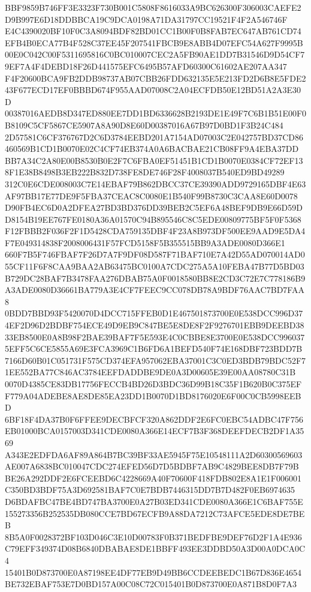 \documentclass[UTF8,fontset=fandol,zihao=-4,a4paper]{ctexart}
\begin{document}
{{BBF9859B746FF3E3323F730B001C5808F8616033A9BC626300F306003CAEFE2D9B997E6D18DDBBCA19C9DCA0198A71DA31797CC19521F4F2A546746F
E4C4390020BF10F0C3A8094BDF82BD01CC1B00F0B8FAB7EC647AB761CD74EFB4B0ECA77B4F528C37EE45F207541FBCB9E8ABB4D07EFC54A627F9995B
00E0C042C00F5311695816C0BC010007CEC2A5FB90AE1DD7B31546D9D54CF79EF7A4F4DEBD18F26D441575EFC6495B57AFD60300C61602AE207AA347
F4F20600BCA9FB2DDB98737AB07CBB26FDD632135E5E213FD2D6B8E5FDE243F677ECD17EF0BBBD674F955AAD07008C2A04ECFDB50E12BD51A2A3E30D
00387016AEDB8D347ED880EE7DD1BD6336628B2193DE1E49F7C6B1B51E00F0B8109C5CF5867CE5907A8A90D8E60D00387016A67B97D0BD1F3B24C484
2D57581C6CF376767D2C6D3784EEBD201A7154AD07003C2E042757BD37CD86460569B1CD1B0070E02C4CF74EB374A0A6BACBAE21CB08FF9A4EBA37DD
BB7A34C2A80E00B8530B0E2F7C6FBA0EF51451B1CD1B0070E0384CF72EF138F1E38B8498B3EB222B832D738FE8DE746F28F4008037B540ED9BD49289
312C0E6CDE008003C7E14EBAF79B862DBCC37CE39390ADD9729165DBF4E63AF97BB17E77DE9F5FBA37CEAC8C0080E1B540F99B8730C3CAA8E60D0078
D90FB4EC6D0A2DFEA27BD3BD376DD39BEB2C5EF6A48BEF9DB9E66D59DD8154B19EE767FE0180A36A01570C94B895546C8C5EDE00809775BF5F0F5368
F12FBBB2F036F2F1D5428CDA759135DBF4F23A8B973DF500EE9AAD9E5DA4F7E049314838F2008006431F57FCD5158F5B355515BB9A3ADE0080D366E1
660F7B5F746FBAF7F26D7A7F9DF08D587F71BAF710E7A42D55AD070014AD055CF11F6F8CAA9BAA2AB63475BC0100A7CDC275A5A10FEBA47B77D5BD03
B729DC28BAF7B3478FAA276DBAB75A0F0018580BB8E2CD3C72E7C778186B9A3ADE0080D36661BA779A3E4CF7FEEC9CC078DB78A9BDF76AAC7BD7FAA8
0BDD7BBD93F5420070D4DCC715FFEB0D1E467501873700E0E538DCC996D374EF2D96D2BDBF754ECE49D9EB9C847BE5E8DE8F2F9276701EBB9DEEBD38
33EB8500E0A8B98F2BAE39BAF7F5E593E4C0CBBE8E3700E0E538DCC9960375EFF5C6CE5855A69E3FCA3969C1B6FD6A1BEFD540F74E168DBF723BDD7B
7166D60B01C051731F575CD374EFA957062EBA37001C3C0ED3BDB79BDC52F71EE552BA77C846AC3784EEFDADDBE9DE0A3D00605E39E00AA08780C31B
0070D4385CE83DB17756FECCB4BD26D3BDC36D99B18C35F1B620B0C375EFF779A04ADEBE8AE8DE85EA23DD1B0070D1BD8176020E6F00C0CB5998EEBD
6BF18F4DA37B0F6FFEE9DECBFCF320A862DDF2E6FC0EBC54ADBC47F756EB01000BCA0157003D341CDE0080A366E14ECF7B3F368DEEFDECB2DF1A3569
A343E2EDFDA6AF89A864B7BC39BF33AE5945F75E10548111A2D60300569603AE007A6838BC010047CDC274EFED56D7D5BDBF7AB9C4829BEE8DB7F79B
BE26A292DDF2E6FCEEBD6C4228669A40F70600F418FDB802E8A1E1F006001C350BD3BDF75A3D692581BAF7C0E7BDB7446315DD7B7D482F0EB6974635
D6BDAFBC47BE4BD747BA3700E0A27B03ED341CDE0080A366E1C6BAF755E155273356B252535DB080CCE7BD67ECFB9A88DA7212C73AFCE5EDE8DE7BEB
8B5A0F0028372BF103D046C3E10D00783F0B371BEDFBE9DEF76D2F1A4E936C79EFF349374D08B6840DBABAE8DE1BBFF493EE3DDBD50A3D00A0DCA0C4
15401B0D873700E0A87198EE4DF77EB9D49BB6CCDEEBEDC1B67D836E4654BE732EBAF753E7D0BD157A00C08C72C015401B0D873700E0A871B8D0F7A3
}}
\end{document}
